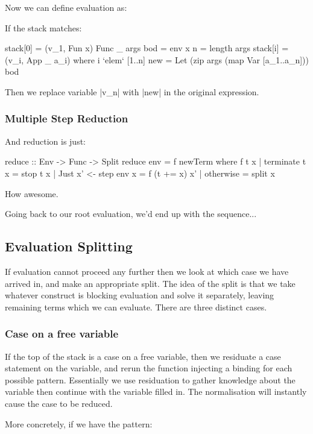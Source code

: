 \documentclass{sigplanconf}
\begin{document}
Now we can define evaluation as:

If the stack matches:

\begin{code}
stack[0] = (v_1, Fun x)
Func _ args bod = env x
n = length args
stack[i] = (v_i, App _ a_i)   where i `elem` [1..n]
new = Let (zip args (map Var [a_1..a_n])) bod
\end{code}

Then we replace variable |v_n| with |new| in the original expression.

\subsubsection{Multiple Step Reduction}

And reduction is just:

\begin{code}
reduce :: Env -> Func -> Split
reduce env = f newTerm
    where f t x | terminate t x = stop t x
                | Just x' <- step env x = f (t += x) x'
                | otherwise = split x
\end{code}

How awesome.

Going back to our root evaluation, we'd end up with the sequence...

\subsection{Evaluation Splitting}
\label{sec:eval_split}

If evaluation cannot proceed any further then we look at which case we have arrived in, and make an appropriate split. The idea of the split is that we take whatever construct is blocking evaluation and solve it separately, leaving remaining terms which we can evaluate. There are three distinct cases.

\subsubsection{Case on a free variable}

If the top of the stack is a case on a free variable, then we residuate a case statement on the variable, and rerun the function injecting a binding for each possible pattern. Essentially we use residuation to gather knowledge about the variable then continue with the variable filled in. The normalisation will instantly cause the case to be reduced.

More concretely, if we have the pattern:
\end{document}
